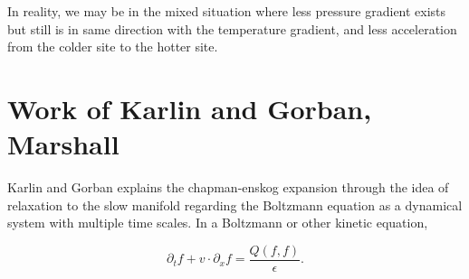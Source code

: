 \documentclass[a4paper,12pt]{article}
\begin{document}
\begin{enumerate}
In reality, we may be in the mixed situation where less pressure gradient exists but still is in same direction with the temperature gradient, and less acceleration from the colder site to the hotter site.
\end{enumerate}

\section{Work of Karlin and Gorban, Marshall}
Karlin and Gorban explains the chapman-enskog expansion through the idea of relaxation to the slow manifold regarding the Boltzmann equation as a dynamical system with multiple time scales. In a Boltzmann or other kinetic equation,

{{{$$ \partial_t f + v \cdot \partial_x f = \frac{Q(f,f)}{\epsilon}. $$}}}
\end{document}
